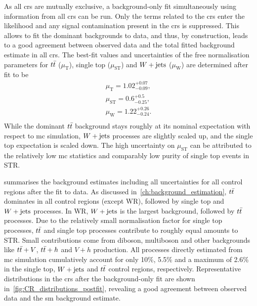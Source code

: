 As all \glspl{cr} are mutually exclusive, a background-only fit simultaneously using information from all \glspl{cr} can be run.
Only the terms related to the \glspl{cr} enter the likelihood and any signal contamination present in the \glspl{cr} is suppressed.
This allows to fit the dominant backgrounds to data, and thus, by construction, leads to a good agreement between observed data and the total fitted background estimate in all \glspl{cr}.
The best-fit values and uncertainties of the free normalisation parameters for $t\bar{t}$ ($\mu_\mathrm{T}$), single top ($\mu_\mathrm{ST}$) and $W+\mathrm{jets}$ ($\mu_\mathrm{W}$) are determined after fit to be
\begin{equation}
	\begin{split}
		\mu_\mathrm{T} = 1.02^{+0.07}_{-0.09}, \\
		\mu_\mathrm{ST} = 0.6^{+0.5}_{-0.25}, \\
		\mu_\mathrm{W} = 1.22^{+0.26}_{-0.24}. \\
	\end{split}
\end{equation}
While the dominant $t\bar{t}$ background stays roughly at its nominal expectation with respect to \gls{mc} simulation, $W+\mathrm{jets}$ processes are slightly scaled up, and the single top expectation is scaled down.
The high uncertainty on $\mu_\mathrm{ST}$ can be attributed to the relatively low \gls{mc} statistics and comparably low purity of single top events in STR.

 summarises the background estimates including all uncertainties for all control regions after the fit to data.
As discussed in~\cref{ch:background_estimation}, $t\bar{t}$ dominates in all control regions (except WR), followed by single top and $W+\mathrm{jets}$ processes.
In WR, $W+\mathrm{jets}$ is the largest background, followed by $t\bar{t}$ processes.
Due to the relatively small normalisation factor for single top processes, $t\bar{t}$ and single top processes contribute to roughly equal amounts to STR.
Small contributions come from diboson, multiboson and other backgrounds like $t\bar{t}+V$, $t\bar{t}+h$ and $V+h$ production.
All processes directly estimated from \gls{mc} simulation cumulatively account for only 10\%, 5.5\% and a maximum of 2.6\% in the single top, $W+\mathrm{jets}$ and $t\bar{t}$ control regions, respectively.
Representative distributions in the \glspl{cr} after the background-only fit are shown in~\cref{fig:CR_distributions_postfit}, revealing a good agreement between observed data and the \gls{sm} background estimate.

